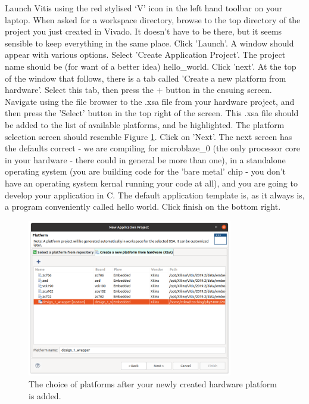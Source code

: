 \documentclass[../physical_computing.tex]{subfiles}
\begin{document}
Launch Vitis using the red stylised `V' icon in the left hand toolbar on your laptop. When asked for a workspace directory, browse to the top directory of the project you just created in Vivado. It doesn't have to be there, but it seems sensible to keep everything in the same place. Click 'Launch'. A window should appear with various options. Select 'Create Application Project'. The project name should be (for want of a better idea) hello\_world. Click 'next'. At the top of the window that follows, there is a tab called 'Create a new platform from hardware'. Select this tab, then press the $+$ button in the ensuing screen. Navigate using the file browser to the .xsa file from your hardware project, and then press the 'Select' button in the top right of the screen. This .xsa file should be added to the list of available platforms, and be highlighted. The platform selection screen should resemble Figure \ref{fig:selectplatform}. Click on 'Next'. The next screen has the defaults correct - we are compiling for microblaze\_0 (the only processor core in your hardware - there could in general be more than one), in a standalone operating system (you are building code for the 'bare metal' chip - you don't have an operating system kernal running your code at all), and you are going to develop your application in C. The default application template is, as it always is, a program conveniently called hello world. Click finish on the bottom right.

\begin{figure}[h!]
    \centering
    \includegraphics[width=0.8\textwidth]{appendix_8/figures/selectplatform.png}
    \caption{The choice of platforms after your newly created hardware platform is added.}
    \label{fig:selectplatform}
\end{figure}
\end{document}
